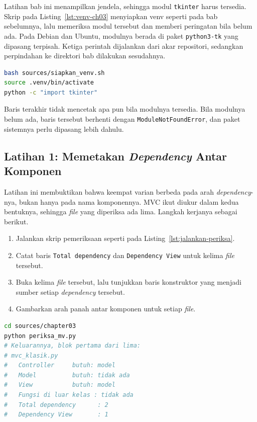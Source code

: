 Latihan bab ini menampilkan jendela, sehingga modul \texttt{tkinter} harus
tersedia. Skrip pada Listing~\ref{lst:venv-ch03} menyiapkan venv seperti pada
bab sebelumnya, lalu memeriksa modul tersebut dan memberi peringatan bila belum
ada. Pada Debian dan Ubuntu, modulnya berada di paket \texttt{python3-tk} yang
dipasang terpisah. Ketiga perintah dijalankan dari akar repositori, sedangkan
perpindahan ke direktori bab dilakukan sesudahnya.

\begin{lstlisting}[language=bash, caption={Menyiapkan venv dan memastikan
  tkinter tersedia, skrip tersedia di \berkas{sources/siapkan_venv.sh}},
  label=lst:venv-ch03]
bash sources/siapkan_venv.sh
source .venv/bin/activate
python -c "import tkinter"
\end{lstlisting}

Baris terakhir tidak mencetak apa pun bila modulnya tersedia. Bila modulnya
belum ada, baris tersebut berhenti dengan \texttt{ModuleNotFoundError}, dan
paket sistemnya perlu dipasang lebih dahulu.

\subsection*{Latihan 1: Memetakan \textit{Dependency} Antar Komponen}

Latihan ini membuktikan bahwa keempat varian berbeda pada arah
\textit{dependency}-nya, bukan hanya pada nama komponennya. MVC ikut diukur
dalam kedua bentuknya, sehingga \textit{file} yang diperiksa ada lima. Langkah kerjanya
sebagai berikut.

\begin{enumerate}
  \item Jalankan skrip pemeriksaan seperti pada Listing~\ref{lst:jalankan-periksa}.
  \item Catat baris \texttt{Total dependency} dan \texttt{Dependency View}
    untuk kelima \textit{file} tersebut.
  \item Buka kelima \textit{file} tersebut, lalu tunjukkan baris konstruktor yang
    menjadi sumber setiap \textit{dependency} tersebut.
  \item Gambarkan arah panah antar komponen untuk setiap \textit{file}.
\end{enumerate}

\begin{lstlisting}[language=bash, caption={Menjalankan pemeriksaan \textit{dependency},
  skrip tersedia di \berkas{sources/chapter03/periksa_mv.py}},
  label=lst:jalankan-periksa]
cd sources/chapter03
python periksa_mv.py
# Keluarannya, blok pertama dari lima:
# mvc_klasik.py
#   Controller     butuh: model
#   Model          butuh: tidak ada
#   View           butuh: model
#   Fungsi di luar kelas : tidak ada
#   Total dependency      : 2
#   Dependency View       : 1
\end{lstlisting}


